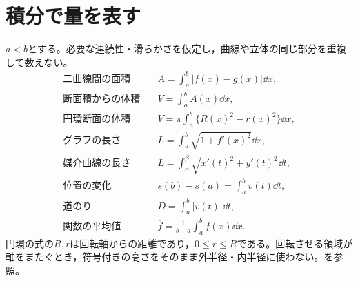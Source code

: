 \section{積分で量を表す}
$a<b$とする。必要な連続性・滑らかさを仮定し，曲線や立体の同じ部分を重複して数えない。
\begin{align*}
 \text{二曲線間の面積}\quad&A=\int_a^b|f(x)-g(x)|\dd x,\\
 \text{断面積からの体積}\quad&V=\int_a^b A(x)\dd x,\\
 \text{円環断面の体積}\quad&V=\pi\int_a^b\{R(x)^2-r(x)^2\}\dd x,\\
 \text{グラフの長さ}\quad&L=\int_a^b\sqrt{1+f'(x)^2}\dd x,\\
 \text{媒介曲線の長さ}\quad&L=\int_\alpha^\beta\sqrt{x'(t)^2+y'(t)^2}\dd t,\\
 \text{位置の変化}\quad&s(b)-s(a)=\int_a^b v(t)\dd t,\\
 \text{道のり}\quad&D=\int_a^b|v(t)|\dd t,\\
 \text{関数の平均値}\quad&\overline f=\frac1{b-a}\int_a^b f(x)\dd x.
\end{align*}
円環の式の$R,r$は回転軸からの距離であり，$0\le r\le R$である。回転させる領域が軸をまたぐとき，符号付きの高さをそのまま外半径・内半径に使わない。を参照。

